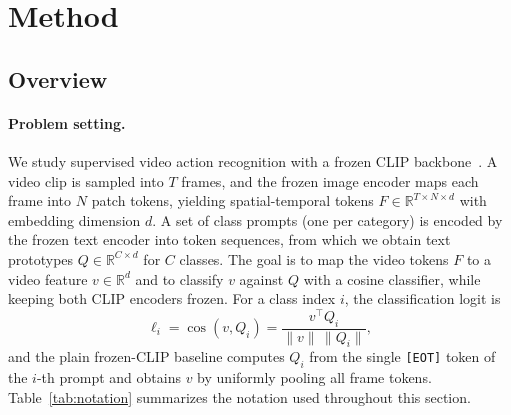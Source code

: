 \section{Method}
\label{sec:method}

\subsection{Overview}
\label{sec:overview}
\paragraph{Problem setting.}
We study supervised video action recognition with a frozen CLIP backbone~\cite{radford2021clip}.
A video clip is sampled into $T$ frames, and the frozen image encoder maps each frame into $N$ patch tokens, yielding spatial-temporal tokens $F \in \mathbb{R}^{T \times N \times d}$ with embedding dimension $d$.
A set of class prompts (one per category) is encoded by the frozen text encoder into token sequences, from which we obtain text prototypes $Q \in \mathbb{R}^{C \times d}$ for $C$ classes.
The goal is to map the video tokens $F$ to a video feature $v \in \mathbb{R}^{d}$ and to classify $v$ against $Q$ with a cosine classifier, while keeping both CLIP encoders frozen.
For a class index $i$, the classification logit is
\begin{equation}
  \ell_i = \cos(v, Q_i) = \frac{v^\top Q_i}{\lVert v \rVert \, \lVert Q_i \rVert},
  \label{eq:classify}
\end{equation}
and the plain frozen-CLIP baseline computes $Q_i$ from the single \texttt{[EOT]} token of the $i$-th prompt and obtains $v$ by uniformly pooling all frame tokens.
Table~\ref{tab:notation} summarizes the notation used throughout this section.

